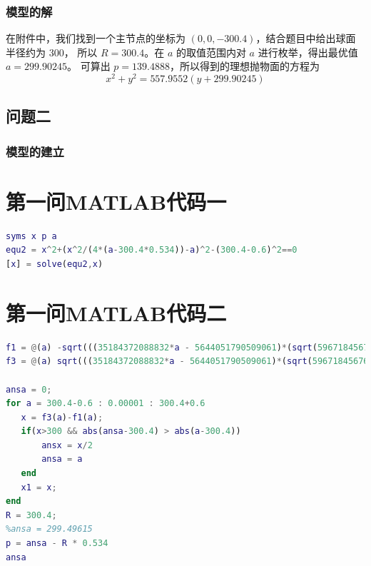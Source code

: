 \documentclass[withoutpreface,bwprint]{cumcmthesis} %
\begin{document}
\subsubsection{模型的解}
在附件中，我们找到一个主节点的坐标为 $(0,0,-300.4)$，结合题目中给出球面半径约为 $300$，
所以 $R = 300.4$。在 $a$ 的取值范围内对 $a$ 进行枚举，得出最优值 $a = 299.90245$。
可算出 $p = 139.4888$，所以得到的理想抛物面的方程为
\[
    x^2 + y^2 = 557.9552(y + 299.90245)
\]
\subsection{问题二}
\subsubsection{模型的建立}

\nocite{宋叶志2019}

\begin{appendices}
    \section{第一问MATLAB代码一}
    \begin{lstlisting}[language=matlab]
syms x p a
equ2 = x^2+(x^2/(4*(a-300.4*0.534))-a)^2-(300.4-0.6)^2==0
[x] = solve(equ2,x)
\end{lstlisting}
    \section{第一问MATLAB代码二}
    \begin{lstlisting}[language=matlab]
f1 = @(a) -sqrt(((35184372088832*a - 5644051790509061)*(sqrt(59671845676091418542400129992729 - 198582418285909280249192906752*a) - 17592186044416*a + 5644051790509061))/154742504910672534362390528);
f3 = @(a) sqrt(((35184372088832*a - 5644051790509061)*(sqrt(59671845676091418542400129992729 - 198582418285909280249192906752*a) - 17592186044416*a + 5644051790509061))/154742504910672534362390528);

ansa = 0;
for a = 300.4-0.6 : 0.00001 : 300.4+0.6
   x = f3(a)-f1(a);
   if(x>300 && abs(ansa-300.4) > abs(a-300.4))
       ansx = x/2
       ansa = a
   end
   x1 = x;
end
R = 300.4;
%ansa = 299.49615
p = ansa - R * 0.534
ansa
\end{lstlisting}
\end{appendices}
\end{document}
